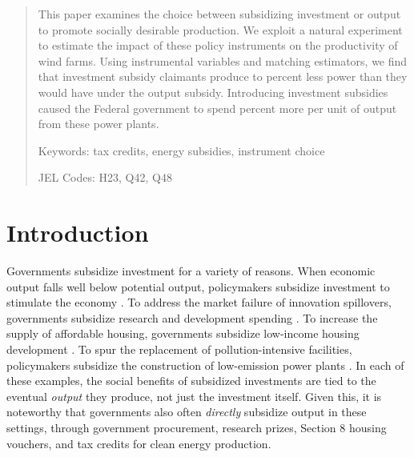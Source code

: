 \documentclass[12pt]{article}
\begin{document}
\date{\monthyeardate\today}
\maketitle
\begin{abstract}
\noindent This paper examines the choice between subsidizing investment or output to promote socially desirable production. We exploit a natural experiment to estimate the impact of these policy instruments on the productivity of wind farms. Using instrumental variables and matching estimators, we find that investment subsidy claimants produce to percent less power than they would have under the output subsidy. Introducing investment subsidies caused the Federal government to spend  percent more per unit of output from these power plants.

\vspace{1cm}

\noindent Keywords: tax credits, energy subsidies, instrument choice

\noindent JEL Codes: H23, Q42, Q48

\vspace{1cm}
\end{abstract}

\pagebreak
\section{Introduction}

Governments subsidize investment for a variety of reasons. When economic output falls well below potential output, policymakers subsidize investment to stimulate the economy \citep{house_temporary_2008,auerbach_activist_2010}. To address the market failure of innovation spillovers, governments subsidize research and development spending \citep{wright1983economics}. To increase the supply of affordable housing, governments subsidize low-income housing development \citep{desai2010tax}. To spur the replacement of pollution-intensive facilities, policymakers subsidize the construction of low-emission power plants \citep{aldy_preliminary_2013}. In each of these examples, the social benefits of subsidized investments are tied to the eventual \textit{output} they produce, not just the investment itself. Given this, it is noteworthy that governments also often \textit{directly} subsidize output in these settings, through government procurement, research prizes, Section 8 housing vouchers, and tax credits for clean energy production. 
\end{document}
